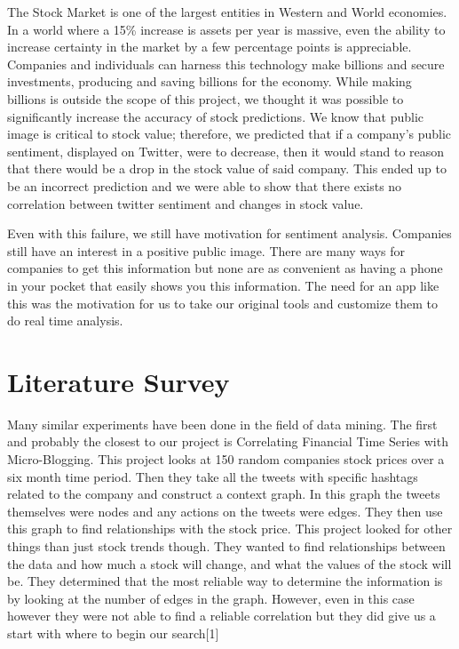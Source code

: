 \documentclass{acm_proc_article-sp}
\begin{document}
The Stock Market is one of the largest entities in Western and World economies.
In a world where a 15\% increase is assets per year is massive,  even the
ability to increase certainty in the market by a few percentage points is appreciable.
Companies and individuals can harness this technology make billions and secure
investments, producing and saving billions for the economy. While making
billions is outside the scope of this project, we thought it was possible to
significantly increase the accuracy of stock predictions. We know that public
image is critical to stock value; therefore, we predicted that if a company's
public sentiment, displayed on Twitter, were to decrease, then it would stand to reason
that there would be a drop in the stock value of said company. This ended up to be an
incorrect prediction and we were able to show that there exists no correlation
between twitter sentiment and changes in stock value.

Even with this failure, we still have motivation for sentiment analysis.
Companies still have an interest in a positive public image. There are many
ways for companies to get this information but none are as convenient as having
a phone in your pocket that easily shows you this information. The need for an
app like this was the motivation for us to take our original tools and
customize them to do real time analysis. 

\section{Literature Survey}

Many similar experiments have been done in the field of data mining. The first
and probably the closest to our project is Correlating Financial Time Series
with Micro-Blogging. This project looks at 150 random companies stock prices
over a six month time period. Then they take all the tweets with specific
hashtags related to the company and construct a context graph. In this graph
the tweets themselves were nodes and any actions on the tweets were edges. They
then use this graph to find relationships with the stock price. This project
looked for other things than just stock trends though. They wanted to find
relationships between the data and how much a stock will change, and what the
values of the stock will be. They determined that the most reliable way to
determine the information is by looking at the number of edges in the graph.
However, even in this case however they were not able to find a reliable
correlation but they did give us a start with where to begin our search[1] 
\end{document}
